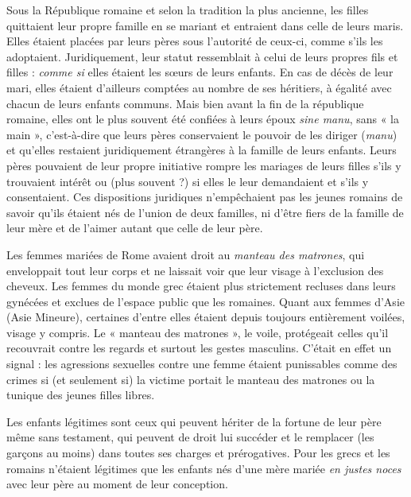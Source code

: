 Sous la République romaine et selon la tradition la plus ancienne,
les filles quittaient leur propre famille en se mariant et entraient dans celle
de leurs maris. Elles étaient placées par leurs pères sous l'autorité de
ceux-ci, comme s'ils les adoptaient. Juridiquement, leur statut ressemblait
à celui de leurs propres fils et filles : \emph{comme si} elles étaient les sœurs de
leurs enfants. En cas de décès de leur mari, elles étaient d'ailleurs comptées
au nombre de ses héritiers, à égalité avec chacun de leurs enfants
communs. Mais bien avant la fin de la république romaine, elles ont le
plus souvent été confiées à leurs époux \emph{sine manu}, sans « la main », c'est-à-dire
que leurs pères conservaient le pouvoir de les diriger (\emph{manu}) et
qu'elles restaient juridiquement étrangères à la famille de leurs enfants.
Leurs pères pouvaient de leur propre initiative rompre les mariages de
leurs filles s'ils y trouvaient intérêt ou (plus souvent ?) si elles le leur demandaient
et s'ils y consentaient. Ces dispositions juridiques n'empêchaient
pas les jeunes romains de savoir qu'ils étaient nés de l'union de
deux familles, ni d'être fiers de la famille de leur mère et de l'aimer autant
que celle de leur père.

Les femmes mariées de Rome avaient droit au \emph{manteau des matrones},
qui enveloppait tout leur corps et ne laissait voir que leur visage à l'exclusion
des cheveux. Les femmes du monde grec étaient plus strictement
recluses dans leurs gynécées et exclues de l'espace public que les romaines.
Quant aux femmes d'Asie (Asie Mineure), certaines d'entre elles
étaient depuis toujours entièrement voilées, visage y compris. Le
« manteau des matrones », le voile, protégeait celles qu'il recouvrait
contre les regards et surtout les gestes masculins. C'était en effet un signal :
les agressions sexuelles contre une femme étaient punissables
comme des crimes si (et seulement si) la victime portait le manteau des
matrones ou la tunique des jeunes filles libres.

Les enfants légitimes sont ceux qui peuvent hériter de la fortune
de leur père même sans testament, qui peuvent de droit lui succéder et le
remplacer (les garçons au moins) dans toutes ses charges et prérogatives.
Pour les grecs et les romains n'étaient légitimes que les enfants nés d'une
mère mariée \emph{en justes noces} avec leur père au moment de leur conception.

